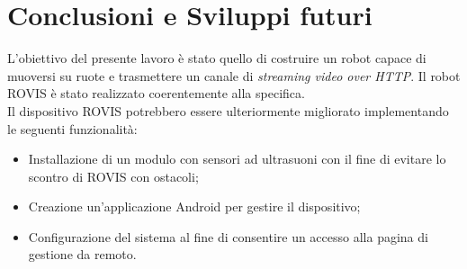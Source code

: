 \documentclass[11pt]{article}
\begin{document}
\section{Conclusioni e Sviluppi futuri}
L'obiettivo del presente lavoro è stato quello di costruire un robot capace di muoversi su ruote e trasmettere un canale di \textit{streaming video over HTTP}. Il robot ROVIS è stato realizzato coerentemente alla specifica.\\
Il dispositivo ROVIS potrebbero essere ulteriormente migliorato implementando le seguenti funzionalità:
\begin{itemize}
	\item Installazione di un modulo con sensori ad ultrasuoni con il fine di evitare lo scontro di ROVIS con ostacoli;
	\item Creazione un'applicazione Android per gestire il dispositivo;
	\item Configurazione del sistema al fine di consentire un accesso alla pagina di gestione da remoto.
\end{itemize}

%
%
\end{document}
